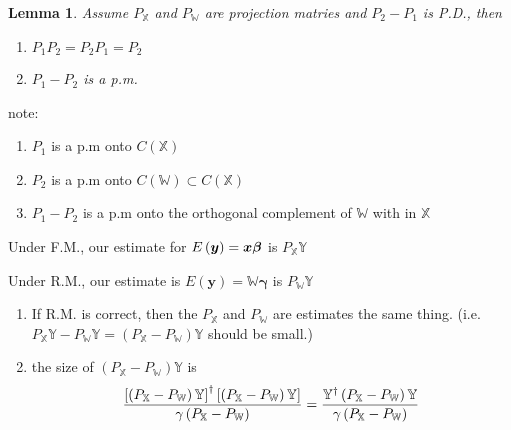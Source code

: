 \documentclass{article}
\newtheorem{lemma}[theorem]{Lemma}
\begin{document}
\bigskip

\begin{lemma}
Assume $P_{\mathbb{X}}$ and $P_{\mathbb{W}}$ are projection matries and $%
P_{2}-P_{1}$ is P.D., then

\begin{enumerate}
\item $P_{1}P_{2}=P_{2}P_{1}=P_{2}$

\item $P_{1}-P_{2}$ is a p.m.
\end{enumerate}
\end{lemma}

\bigskip

note:

\begin{enumerate}
\item $P_{1}$ is a p.m onto $C\left( \mathbb{X}\right) $

\item $P_{2}$ is a p.m onto $C\left( \mathbb{W}\right) \subset C\left( 
\mathbb{X}\right) $

\item $P_{1}-P_{2}$ is a p.m onto the orthogonal complement of $\mathbb{W}$
with in $\mathbb{X}$
\end{enumerate}

\bigskip


\bigskip

Under F.M., our estimate for $E\left( \boldsymbol{y}\right) =\boldsymbol{%
x\beta }$ is $P_{\mathbb{X}}\mathbb{Y}$

Under R.M., our estimate is $E\left( \boldsymbol{y}\right) =\mathbb{W}%
\boldsymbol{\gamma }$ is $P_{\mathbb{W}}\mathbb{Y}$

\begin{enumerate}
\item If R.M. is correct, then the $P_{\mathbb{X}}$ and $P_{\mathbb{W}}$ are
estimates the same thing. (i.e. $P_{\mathbb{X}}\mathbb{Y}-P_{\mathbb{W}}%
\mathbb{Y=}\left( P_{\mathbb{X}}-P_{\mathbb{W}}\right) \mathbb{Y}$ should be
small.)

\item the size of $\left( P_{\mathbb{X}}-P_{\mathbb{W}}\right) \mathbb{Y}$ is%
\begin{equation*}
\frac{\left[ \left( P_{\mathbb{X}}-P_{\mathbb{W}}\right) \mathbb{Y}\right]
^{\dagger }\left[ \left( P_{\mathbb{X}}-P_{\mathbb{W}}\right) \mathbb{Y}%
\right] }{\gamma \left( P_{\mathbb{X}}-P_{\mathbb{W}}\right) }=\frac{\mathbb{%
Y}^{\dagger }\left( P_{\mathbb{X}}-P_{\mathbb{W}}\right) \mathbb{Y}}{\mathbb{%
\gamma }\left( P_{\mathbb{X}}-P_{\mathbb{W}}\right) }
\end{equation*}
\end{enumerate}
\end{document}
